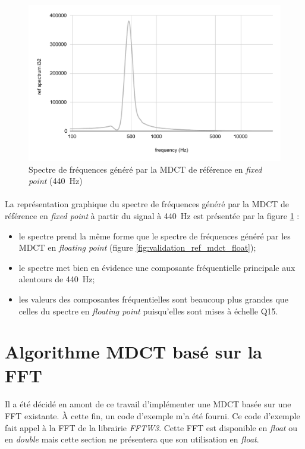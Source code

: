 \documentclass{article}
\begin{document}
    \begin{figure}[H]
        \centering
        \includegraphics[width=.8\linewidth]{./images/validation_ref_int.pdf}
        \caption{Spectre de fréquences généré par la MDCT de référence en \emph{fixed point} (\SI{440}{\hertz})}
        \label{fig:validation_ref_mdct_int}
    \end{figure}

    \paragraph{}
    La représentation graphique du spectre de fréquences généré par la MDCT de référence en \emph{fixed point} à partir du signal à \SI{440}{\hertz} est présentée par la figure \ref{fig:validation_ref_mdct_int} :
    \begin{itemize}
        \item le spectre prend la même forme que le spectre de fréquences généré par les MDCT en \emph{floating point} (figure \ref{fig:validation_ref_mdct_float});
        \item le spectre met bien en évidence une composante fréquentielle principale aux alentours de \SI{440}{\hertz};
        \item les valeurs des composantes fréquentielles sont beaucoup plus grandes que celles du spectre en \emph{floating point} puisqu'elles sont mises à échelle Q15.
    \end{itemize}



    \newpage
    \section{Algorithme MDCT basé sur la FFT}

    \paragraph{}
    Il a été décidé en amont de ce travail d'implémenter une MDCT basée sur une FFT existante. À cette fin, un code d'exemple m'a été fourni\cite{dsprelated}. Ce code d'exemple fait appel à la FFT de la librairie \emph{FFTW3}. Cette FFT est disponible en \emph{float} ou en \emph{double} mais cette section ne présentera que son utilisation en \emph{float}.
\end{document}

